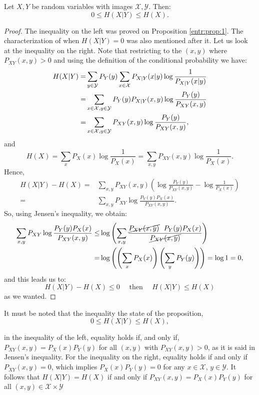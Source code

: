 \begin{nprop}\label{entr:prop:2}
Let $X,Y$ be random variables with images $\mathcal X, \mathcal Y$. Then:
$$
0 \leq H(X|Y) \leq H(X).
$$
\end{nprop}
\begin{proof}

The inequality on the left was proved on Proposition \ref{entr:prop:1}. The characterization of when $H(X|Y) = 0$ was also mentioned after it.
Let us look at the inequality on the right. Note that restricting to the $(x,y)$ where $P_{XY}(x,y) > 0$ and using the definition of the conditional probability we have:
\begin{align*}
H(X|Y) = & \sum_{y \in \mathcal{Y}} P_Y(y) \sum_{x \in \mathcal{X}} P_{X|Y}(x|y)\log \frac{1}{P_{X|Y}(x|y)}\\
 = & \sum_{x \in \mathcal X,y \in \mathcal Y} P_Y(y) P_{X|Y}(x,y) \log \frac{P_Y(y)}{P_{XY}(x,y)} \\
  = & \sum_{x \in \mathcal X,y \in \mathcal Y} P_{XY}(x,y)\log \frac{P_Y(y)}{P_{XY}(x,y)} ,
\end{align*}
and 
$$
H(X) = \sum_x P_X(x) \log \frac{1}{P_X(x)} = \sum_{x,y}P_{XY}(x,y) \log \frac{1}{P_X(x)}.
$$
Hence,
\begin{equation}\label{eq:dif-expr-mi}
\begin{split}
H(X|Y) - H(X) = & \sum_{x,y}P_{XY}(x,y) \left( \log \frac{P_Y(y)}{P_{XY}(x,y)} - \log \frac{1}{P_X(x)}\right) \\ 
= &  \sum_{x,y}P_{XY}\log \frac{P_Y(y)P_X(x)}{P_{XY}(x,y)}.
\end{split}
\end{equation}
So, using Jensen's inequality, we obtain:
\begin{align*}
\sum_{x,y}P_{XY}\log \frac{P_Y(y)P_X(x)}{P_{XY}(x,y)} \leq & \log \left( \sum_{x,y}\frac{ \cancel{P_{XY}(x,y)} \ \  P_Y(y) P_X(x)}{\cancel{P_{XY}(x,y)}} \right) \\ 
= & \log\left( \left( \sum_x P_X(x) \right) \left(\sum_y P_Y(y)\right)\right) = \log 1 = 0,
\end{align*}
and this leads us to:
\begin{equation}\label{prop:2:2nd:ineq}
H(X|Y) - H(X) \leq 0 \quad \text{ then } \quad H(X|Y) \leq H(X)
\end{equation}
as we wanted.
\end{proof}

It must be noted that the inequality the state of the proposition,
$$
0 \leq H(X|Y) \leq H(X),
$$

in the inequality of the left, equality holds if, and only if, $P_{XY}(x,y) = P_X(x) P_Y(y)$ for all $(x,y)$ with $P_{XY} (x,y) > 0$, as it is said in Jensen's inequality.
For the inequality on the right, equality holds if and only if $P_{XY}(x,y) = 0$, which implies $P_X(x)P_Y(y) = 0$ for any $x\in \mathcal X$, $y \in \mathcal Y$. It follows that $H(X|Y) = H(X)$ if and only if $P_{XY}(x,y) = P_X(x)P_Y(y)$ for all $(x,y) \in \mathcal X \times \mathcal Y$

